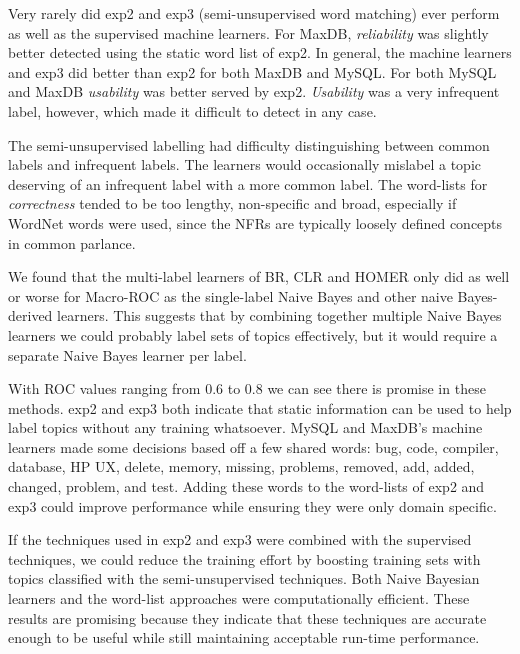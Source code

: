\documentclass[smallextended]{svjour3}       %
\begin{document}
Very rarely did \textsf{exp2} and \textsf{exp3} (semi-unsupervised word matching) ever perform as well as the supervised machine learners. 
For MaxDB, \textit{reliability} was slightly better detected using the static word list of \textsf{exp2}. 
In general, the machine learners and \textsf{exp3} did better than \textsf{exp2} for both MaxDB and MySQL. 
For both MySQL and MaxDB \textit{usability} was better served by \textsf{exp2}. 
\textit{Usability} was a very infrequent label, however, which made it difficult to detect in any case.

The semi-unsupervised labelling had difficulty distinguishing between common labels and infrequent labels. 
The learners would occasionally mislabel a topic deserving of an infrequent label with a more common label.
The word-lists for \emph{correctness} tended to be too lengthy, non-specific and broad, especially if WordNet words were used, since the NFRs are typically loosely defined concepts in common parlance.

We found that the multi-label learners of BR, CLR and HOMER only did
as well or worse for Macro-ROC as the single-label Naive Bayes and other naive Bayes-derived learners. 
This suggests that by combining together multiple Naive Bayes learners
we could probably label sets of topics effectively, but it would
require a separate Naive Bayes learner per label.


With ROC values ranging from $0.6$ to $0.8$ we can see there is promise in these methods.
\textsf{exp2} and \textsf{exp3} both indicate that static information can be used to help label topics without any training whatsoever. 
MySQL and MaxDB's machine learners made some decisions based off a few shared words: \textsf{bug, code, compiler, database, HP UX, delete, memory, missing, problems, removed, add, added, changed, problem, and test}. 
Adding these words to the word-lists of \textsf{exp2} and \textsf{exp3} could improve performance while ensuring they were only domain specific.

If the techniques used in \textsf{exp2} and \textsf{exp3} were combined with the supervised techniques, we could reduce the training effort by boosting training sets with topics classified with the semi-unsupervised techniques.
Both Naive Bayesian learners and the word-list approaches were computationally efficient.  
These results are promising because they indicate that these
techniques are accurate enough to be useful while still maintaining
acceptable run-time performance.
\end{document}
